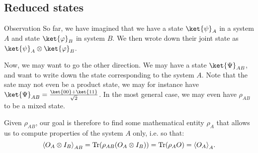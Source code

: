 \documentclass[a4paper]{article}
\begin{document}
\subsection{Reduced states}

\begin{parag}{Observation}
    So far, we have imagined that we have a state $\ket{\psi}_A$ in a system $A$ and state $\ket{\phi}_B$ in system $B$. We then wrote down their joint state as $\ket{\psi}_A \otimes \ket{\phi}_B$.

    Now, we may want to go the other direction. We may have a state $\ket{\Psi}_{AB}$, and want to write down the state corresponding to the system $A$. Note that the sate may not even be a product state, we may for instance have $\ket{\Psi}_{AB} = \frac{\ket{00} + \ket{11}}{\sqrt{2}}$. In the most general case, we may even have $\rho_{AB}$ to be a mixed state.

    Given $\rho_{AB}$, our goal is therefore to find some mathematical entity $\rho_A$ that allows us to compute properties of the system $A$ only, i.e. so that:
    \[\left\langle O_A \otimes I_B \right\rangle_{AB} = \Tr\left(\rho_{AB} \left(O_A \otimes I_B\right)\right) = \Tr\left(\rho_A O\right) = \left\langle O_A \right\rangle_{A}.\] 
\end{parag}
\end{document}
